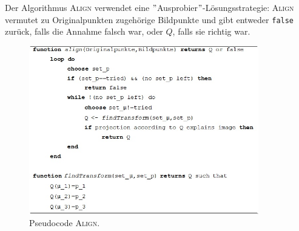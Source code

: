 Der Algorithmus \textsc{Align} verwendet eine $"$Ausprobier$"$-Lösungsstrategie: \textsc{Align} vermutet zu Originalpunkten zugehörige Bildpunkte und gibt entweder \verb+false+ zurück, falls die Annahme falsch war, oder $Q$, falls sie richtig war.
\begin{figure}[h]
\centering
\includegraphics[width=10cm]{chapters/computervision/grafik_15_align.jpg}
\caption{Pseudocode \textsc{Align}.}
\label{fig:15}
\end{figure}


